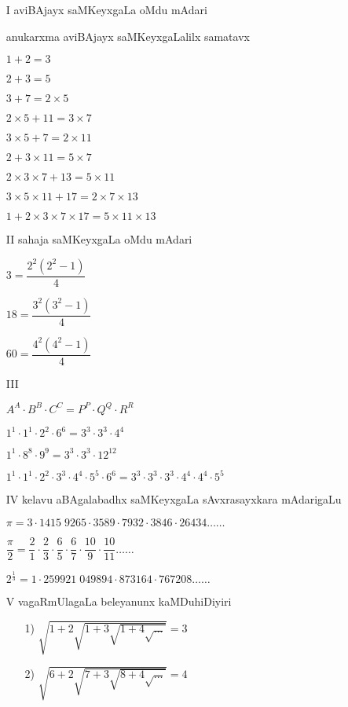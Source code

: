 \begin{enumerate}
\item[{\rm I}] aviBAjayx saMKeyxgaLa oMdu mAdari

anukarxma aviBAjayx saMKeyxgaLalilx samatavx

$1+2=3$

$2+3=5$

$3+7= 2 \times 5$

$2 \times 5+11=3 \times 7$

$3 \times 5+7= 2 \times 11$

$2+3 \times 11= 5 \times 7$

$2 \times 3 \times 7 + 13= 5 \times 11$

$3 \times 5 \times 11 + 17= 2 \times 7 \times 13$

$1+2 \times 3 \times 7 \times 17 = 5 \times 11 \times 13$

\item[{\rm II}] sahaja saMKeyxgaLa oMdu mAdari

$3= \dfrac{2^{2}(2^{2}-1)}{4}$

$18= \dfrac{3^{2}(3^{2}-1)}{4}$

$60= \dfrac{4^{2}(4^{2}-1)}{4}$

\item[{\rm III}] 

$A^{A}\cdot B^{B}\cdot C^{C}=P^{P}\cdot Q^{Q}\cdot R^{R}$

$1^{1}\cdot 1^{1}\cdot 2^{2}\cdot 6^{6}=3^{3}\cdot 3^{3}\cdot 4^{4}$

$1^{1}\cdot 8^{8}\cdot 9^{9}=3^{3}\cdot 3^{3}\cdot 12^{12}$

$1^{1}\cdot 1^{1}\cdot 2^{2}\cdot 3^{3}\cdot 4^{4}\cdot 5^{5}\cdot 6^{6} = 3^{3}\cdot 3^{3}\cdot 3^{3}\cdot 4^{4}\cdot 4^{4}\cdot 5^{5}$

\item[{\rm IV}] kelavu aBAgalabadhx saMKeyxgaLa sAvxrasayxkara mAdarigaLu

$\pi = 3\cdot 1415 \; 9265\cdot 3589\cdot 7932\cdot 3846\cdot 26434 \ldots\ldots$

$\dfrac{\pi}{2}= \dfrac{2}{1} \cdot \dfrac{2}{3}  \cdot \dfrac{6}{5}\cdot \dfrac{6}{7}\cdot \dfrac{10}{9}\cdot \dfrac{10}{11}\ldots\ldots $

$2^{\frac{1}{3}}= 1\cdot 259921 \; 049894\cdot 873164\cdot 767208\ldots\ldots$

\item[{\rm V}] vagaRmUlagaLa beleyanunx kaMDuhiDiyiri
\begin{itemize}
\item[{\rm 1)}] $\sqrt{1+2\sqrt{1+3\sqrt{1+4\sqrt{\ldots}}}} =3$
\item[{\rm 2)}] $\sqrt{6+2\sqrt{7+3\sqrt{8+4\sqrt{\ldots}}}} =4$
\end{itemize}


\end{enumerate}

